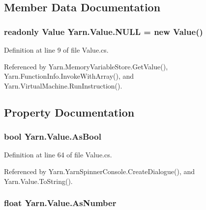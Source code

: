 \subsection{Member Data Documentation}
\hypertarget{a00165_a1ed2964965baca8621c45efa23f37660}{
\subsubsection[{N\-U\-L\-L}]{\setlength{\rightskip}{0pt plus 5cm}readonly {\bf Value} Yarn.\-Value.\-N\-U\-L\-L = new {\bf Value}()\hspace{0.3cm}{\ttfamily [static]}}}\label{a00165_a1ed2964965baca8621c45efa23f37660}


Definition at line 9 of file Value.\-cs.



Referenced by Yarn.\-Memory\-Variable\-Store.\-Get\-Value(), Yarn.\-Function\-Info.\-Invoke\-With\-Array(), and Yarn.\-Virtual\-Machine.\-Run\-Instruction().



\subsection{Property Documentation}
\hypertarget{a00165_a5805faef3b3d376090ff096d6dd6c064}{
\subsubsection[{As\-Bool}]{\setlength{\rightskip}{0pt plus 5cm}bool Yarn.\-Value.\-As\-Bool\hspace{0.3cm}{\ttfamily [get]}}}\label{a00165_a5805faef3b3d376090ff096d6dd6c064}


Definition at line 64 of file Value.\-cs.



Referenced by Yarn.\-Yarn\-Spinner\-Console.\-Create\-Dialogue(), and Yarn.\-Value.\-To\-String().

\hypertarget{a00165_a751419743761562bf902246d6e6a3c0a}{
\subsubsection[{As\-Number}]{\setlength{\rightskip}{0pt plus 5cm}float Yarn.\-Value.\-As\-Number\hspace{0.3cm}{\ttfamily [get]}}}\label{a00165_a751419743761562bf902246d6e6a3c0a}


